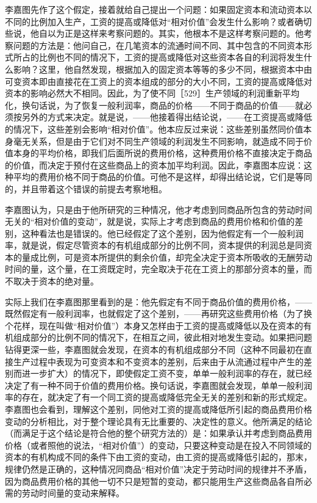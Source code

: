 李嘉图先作了这个假定，接着就给自己提出一个问题：如果固定资本和流动资本以不同的比例加入生产，工资的提高或降低对“相对价值”会发生什么影响？或者确切些说，他自以为正是这样来考察问题的。其实，他根本不是这样考察问题的。他考察问题的方法是：他问自己，在几笔资本的流通时间不同、其中包含的不同资本形式所占的比例也不同的情况下，工资的提高或降低对这些资本各自的利润将发生什么影响？这里，他自然发现，根据加入的固定资本等等的多少不同，根据资本中由可变资本即由直接花在工资上的资本组成的部分的大小不同，工资的提高或降低对资本的影响必然大不相同。因此，为了使不同［529］生产领域的利润重新平均化，换句话说，为了恢复一般利润率，商品的价格——不同于商品的价值——就必须按另外的方式来决定。就是说，——他接着得出结论说，——在工资提高或降低的情况下，这些差别会影响“相对价值”。他本应反过来说：这些差别虽然同价值本身毫无关系，但是由于它们对不同生产领域的利润发生不同影响，就造成不同于价值本身的平均价格，即我们后面所说的费用价格，这种费用价格不直接决定于商品的价值，而决定于预付在这些商品上的资本加平均利润。因此，李嘉图本应说：这种平均的费用价格不同于商品的价值。可他不是这样，却得出结论说，它们是等同的，并且带着这个错误的前提去考察地租。

李嘉图认为，只是由于他所研究的三种情况，他才考虑到同商品所包含的劳动时间无关的“相对价值的变动”，就是说，实际上才考虑到商品的费用价格和价值的差别，这种看法也是错误的。他已经假定了这个差别，因为他假定有一个一般利润率，就是说，假定尽管资本的有机组成部分的比例不同，资本提供的利润总是同资本的量成比例，可是资本所提供的剩余价值，却完全决定于资本所吸收的无酬劳动时间的量，这个量，在工资既定时，完全取决于花在工资上的那部分资本的量，而不取决于资本的绝对量。

实际上我们在李嘉图那里看到的是：他先假定有不同于商品价值的费用价格，——既然假定有一般利润率，也就假定了这个差别，——再研究这些费用价格（为了换个花样，现在叫做“相对价值”）本身又怎样由于工资的提高或降低以及在资本的有机组成部分的比例不同的情况下，在相互之间，彼此相对地发生变动。如果把问题钻得更深一些，李嘉图就会发现，在资本的有机组成部分不同（这种不同最初在直接生产过程中表现为可变资本和不变资本的差别，后来由于从流通过程中产生的差别而进一步扩大）的情况下，即使假定工资不变，单单一般利润率的存在，就已经决定了有一种不同于价值的费用价格。换句话说，李嘉图就会发现，单单一般利润率的存在，就决定了有一个同工资的提高或降低完全无关的差别和新的形式规定。李嘉图也会看到，理解这个差别，同他对工资的提高或降低所引起的商品费用价格变动的分析相比，对于整个理论具有无比重要的、决定性的意义。他所满足的结论（而满足于这个结论是符合他的整个研究方法的）是：如果承认并考虑到商品费用价格（或者照他的说法，“相对价值”）的变动，只要这种变动是在投入不同领域的资本的有机构成不同的条件下由工资的变动，由工资的提高或降低引起的，那末，规律仍然是正确的，这种情况同商品“相对价值”决定于劳动时间的规律并不矛盾，因为商品费用价格的其他一切不只是短暂的变动，都只能用生产这些商品各自所必需的劳动时间量的变动来解释。

